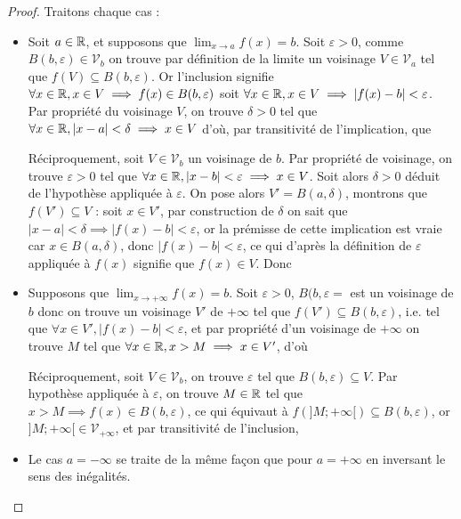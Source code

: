 \begin{proof}
    Traitons chaque cas :
    \begin{itemize}[label=$\bullet$]
        \item Soit $a\in\mathbb{R}$, et supposons que $\displaystyle{\lim_{x\to a} f(x) = b}$. Soit $\varepsilon > 0$, comme $B(b,\varepsilon)\in\mathcal V_b$ on trouve par définition de la limite un voisinage $V\in\mathcal V_a$ tel que $f(V)\subseteq B(b,\varepsilon)$. Or l'inclusion signifie $\forall x\in\mathbb{R}, x\in V\implies f(x)\in B(b,\varepsilon)$ soit $\forall x\in\mathbb{R}, x\in V \implies |f(x)-b| < \varepsilon$. Par propriété du voisinage $V$, on trouve $\delta > 0$ tel que $\forall x\in \mathbb{R}, |x-a| < \delta \implies x \in V$ d'où, par transitivité de l'implication, que 
        
        Réciproquement, soit $V\in\mathcal V_b$ un voisinage de $b$. Par propriété de voisinage, on trouve $\varepsilon > 0$ tel que $\forall x\in\mathbb{R}, |x-b| < \varepsilon \implies x\in V$. Soit alors $\delta > 0$ déduit de l'hypothèse appliquée à $\varepsilon$. On pose alors $V' = B(a,\delta)$, montrons que $f(V')\subseteq V$ : soit $x\in V'$, par construction de $\delta$ on sait que $|x-a| < \delta\implies |f(x) - b| < \varepsilon$, or la prémisse de cette implication est vraie car $x\in B(a,\delta)$, donc $|f(x)-b| < \varepsilon$, ce qui d'après la définition de $\varepsilon$ appliquée à $f(x)$ signifie que $f(x)\in V$. Donc 

        \item Supposons que $\displaystyle{\lim_{x\to +\infty} f(x) = b}$. Soit $\varepsilon>0$, $B(b,\varepsilon=$ est un voisinage de $b$ donc on trouve un voisinage $V'$ de $+\infty$ tel que $f(V')\subseteq B(b,\varepsilon)$, i.e. tel que $\forall x\in V', |f(x)-b| < \varepsilon$, et par propriété d'un voisinage de $+\infty$ on trouve $M$ tel que $\forall x\in \mathbb{R}, x > M \implies x\in V'$, d'où 

        Réciproquement, soit $V\in\mathcal V_b$, on trouve $\varepsilon$ tel que $B(b,\varepsilon)\subseteq V$. Par hypothèse appliquée à $\varepsilon$, on trouve $M\in\mathbb{R}$ tel que $x > M \implies f(x)\in B(b,\varepsilon)$, ce qui équivaut à $f(]M;+\infty[)\subseteq B(b,\varepsilon)$, or $]M;+\infty[\in\mathcal V_{+\infty}$, et par transitivité de l'inclusion, 

        \item Le cas $a = -\infty$ se traite de la même façon que pour $a = +\infty$ en inversant le sens des inégalités.
    \end{itemize}
\end{proof}

